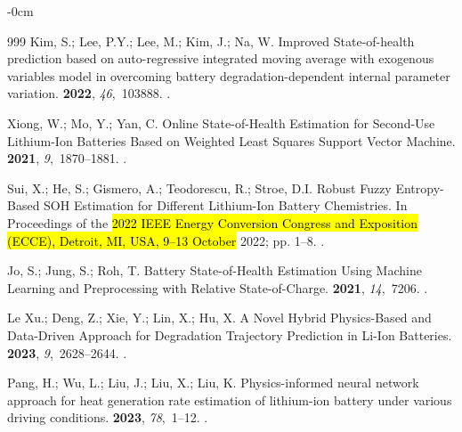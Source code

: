 \documentclass[energies,article,accept,pdftex,moreauthors]{Definitions/mdpi}
\begin{document}
\begin{adjustwidth}{-\extralength}{0cm}
\begin{thebibliography}{999}
Kim, S.; Lee, P.Y.; Lee, M.; Kim, J.; Na, W.
\newblock Improved State-of-health prediction based on auto-regressive
  integrated moving average with exogenous variables model in overcoming
  battery degradation-dependent internal parameter variation.
 {\bf 2022}, {\em 46},~103888.
.

Xiong, W.; Mo, Y.; Yan, C.
\newblock Online State-of-Health Estimation for Second-Use Lithium-Ion
  Batteries Based on Weighted Least Squares Support Vector Machine.
 {\bf 2021}, {\em 9},~1870--1881.
.

Sui, X.; He, S.; Gismero, A.; Teodorescu, R.; Stroe, D.I.
\newblock Robust Fuzzy Entropy-Based SOH Estimation for Different Lithium-Ion
  Battery Chemistries. In Proceedings of the\hl{ 2022 IEEE Energy Conversion Congress and Exposition (ECCE), Detroit, MI, USA, 9--13 October} 2022;
\newblock pp. 1--8.
.

Jo, S.; Jung, S.; Roh, T.
\newblock Battery State-of-Health Estimation Using Machine Learning and
  Preprocessing with Relative State-of-Charge.
 {\bf 2021}, {\em 14},~7206.
.

{Le Xu}.; Deng, Z.; Xie, Y.; Lin, X.; Hu, X.
\newblock A Novel Hybrid Physics-Based and Data-Driven Approach for Degradation
  Trajectory Prediction in Li-Ion Batteries.
 {\bf 2023},
  {\em 9},~2628--2644.
.

Pang, H.; Wu, L.; Liu, J.; Liu, X.; Liu, K.
\newblock Physics-informed neural network approach for heat generation rate
  estimation of lithium-ion battery under various driving conditions.
 {\bf 2023}, {\em 78},~1--12.
.


\end{thebibliography}
\end{adjustwidth}
\end{document}
